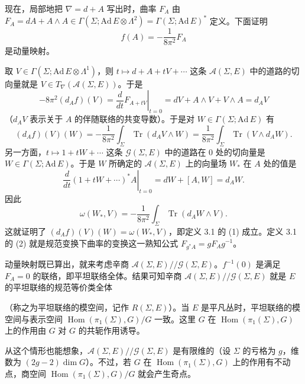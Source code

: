 
现在，局部地把 $\nabla=d+A$ 写出时，曲率 $F_A$ 由 $F_A=dA+A\wedge A\in\Gamma(\Sigma;\mathrm{Ad}\,E\otimes\Lambda^2)=\Gamma(\Sigma;\mathrm{Ad}\,E)^*$ 定义。下面证明
\begin{equation}
  f(A)=-\frac{1}{8\pi^2}F_A \tag{3.3}
\end{equation}
是动量映射。

取 $V\in\Gamma(\Sigma;\mathrm{Ad}\,E\otimes\Lambda^1)$，则 $t\mapsto d+A+tV+\cdots$ 这条 $\mathcal{A}(\Sigma,E)$ 中的道路的切向量就是 $V\in T_\nabla(\mathcal{A}(\Sigma,E))$。于是
\[
  -8\pi^2(d_Af)(V)=\left.\frac{d}{dt}F_{A+tV}\right|_{t=0}=dV+A\wedge V+V\wedge A=d_AV
\]
（$d_AV$ 表示关于 $A$ 的伴随联络的共变导数）。于是对 $W\in\Gamma(\Sigma;\mathrm{Ad}\,E)$ 有
\[
  (d_Af)(V)(W)=-\frac{1}{8\pi^2}\int_\Sigma\operatorname{Tr}(d_AV\wedge W)
  =\frac{1}{8\pi^2}\int_\Sigma\operatorname{Tr}(V\wedge d_AW).
\]
另一方面，$t\mapsto1+tW+\cdots$ 这条 $\mathcal{G}(\Sigma,E)$ 中的道路在 $0$ 处的切向量是 $W\in\Gamma(\Sigma;\mathrm{Ad}\,E)$。于是 $W$ 所确定的 $\mathcal{A}(\Sigma,E)$ 上的向量场 $W_*$ 在 $A$ 处的值是
\[
  \left.\frac{d}{dt}(1+tW+\cdots)^*A\right|_{t=0}=dW+[A,W]=d_AW.
\]
因此
\[
  \omega(W_*,V)=-\frac{1}{8\pi^2}\int_\Sigma\operatorname{Tr}(d_AW\wedge V).
\]
这就证明了 $(d_Af)(V)(W)=\omega(W_*,V)$，即定义 3.1 的 (1) 成立。定义 3.1 的 (2) 就是规范变换下曲率的变换这一熟知公式 $F_{g^*A}=gF_Ag^{-1}$。

动量映射既已算出，就来考虑辛商 $\mathcal{A}(\Sigma,E)/\!/\mathcal{G}(\Sigma,E)$。$f^{-1}(0)$ 是满足 $F_A=0$ 的联络，即平坦联络全体。结果可知辛商 $\mathcal{A}(\Sigma,E)/\!/\mathcal{G}(\Sigma,E)$ 就是 $E$ 的平坦联络的规范等价类全体

（称之为平坦联络的模空间，记作 $R(\Sigma,E)$）。当 $E$ 是平凡丛时，平坦联络的模空间与表示空间 $\operatorname{Hom}(\pi_1(\Sigma),G)/G$ 一致。这里 $G$ 在 $\operatorname{Hom}(\pi_1(\Sigma),G)$ 上的作用由 $G$ 对 $G$ 的共轭作用诱导。

从这个情形也能想象，$\mathcal{A}(\Sigma,E)/\!/\mathcal{G}(\Sigma,E)$ 是有限维的（设 $\Sigma$ 的亏格为 $g$，维数为 $(2g-2)\dim G$）。不过，若 $G$ 在 $\operatorname{Hom}(\pi_1(\Sigma),G)$ 上的作用有不动点，商空间 $\operatorname{Hom}(\pi_1(\Sigma),G)/G$ 就会产生奇点。

